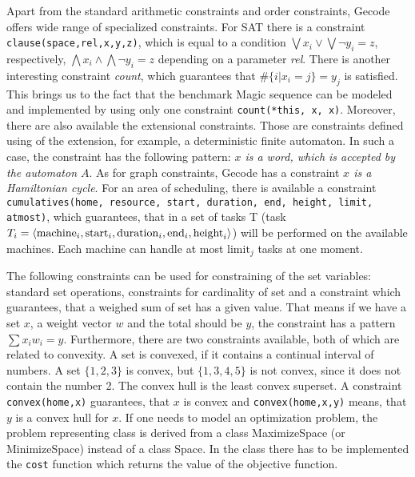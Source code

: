 Apart from the standard arithmetic constraints and order constraints, Gecode offers
wide range of specialized constraints. For SAT there is a constraint \texttt{clause(space,rel,x,y,z)},
which is equal to a condition $\bigvee {x_i} \vee \bigvee{\neg y_i} = z$, respectively, $\bigwedge {x_i} \wedge \bigwedge{\neg y_i} = z$
depending on a parameter {\em rel}. There is another interesting constraint {\em count}, which 
guarantees that $\#\{i|x_i = j\} = y_j$ is satisfied. This brings us to the fact
that the benchmark Magic sequence can be modeled and implemented by using only one constraint \texttt{count(*this, x, x)}.
Moreover, there are also available the extensional constraints. Those are constraints defined 
using of the extension, for example, a deterministic finite automaton. In such a case, the constraint
has the following pattern:  {\em $x$ is a word, which is accepted by the automaton $A$}. As for graph constraints, 
Gecode has a constraint {\em $x$ is a Hamiltonian cycle}. For an area of scheduling, there is available
a constraint \texttt{cumulatives(home, resource, start, duration, end, height, limit, atmost)}, which
gu\-arantees, that in a set of tasks T (task $T_i = \langle \mathrm{machine}_i, \mathrm{start}_i,
\mathrm{duration}_i, \mathrm{end}_i,\\ \mathrm{height}_i \rangle$) will be performed on 
the available machines. Each machine can handle at most $\mathrm{limit}_j$ tasks at
one moment.

The following constraints can be used for constraining of the set variables: standard 
set operations, constraints for cardinality of set and a constraint
which guarantees, that a weighed sum of set has a given value. That means if we have a set $x$, 
a weight vector $w$ and the total should be $y$, the constraint has a pattern $\sum{x_i w_i} = y$. 
Furthermore, there are two constraints available, both of which are related to convexity. A set is convexed, 
if it contains a continual interval of numbers. A set $\{1,2,3\}$ is convex, but $\{1,3,4,5\}$ is not 
convex, since it does not contain the number 2. The convex hull is the least convex superset. A constraint
\texttt{convex(home,x)} guarantees, that $x$ is convex and \texttt{convex(home,x,y)} means, that $y$ is a convex hull for $x$.
If one needs to model an optimization problem, the problem representing class is derived from a class MaximizeSpace (or MinimizeSpace)
instead of a class Space. In the class there has to be implemented the \texttt{cost} function which returns
the value of the objective function. 

